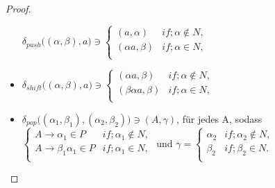 \begin{proof}
\begin{itemize}
$\delta_{push}\big ( (\alpha, \beta),a \big )\ni 
\begin{cases}
(a, \alpha) & if; \alpha \notin N, \\
(\alpha a, \beta) & if;  \alpha \in N, \\
\end{cases}$
\item
$\delta_{shift}\big ( (\alpha, \beta),a \big )\ni 
\begin{cases}
(\alpha a, \beta) & if; \alpha \notin N, \\
(\beta\alpha a, \beta) & if;  \alpha \in N, \\
\end{cases}$
\item
$\delta_{pop}\big ( (\alpha_1, \beta_1), (\alpha_2, \beta_2) \big ) \ni (A, \gamma)$, für jedes A, sodass\\
$\begin{cases}
A\rightarrow \alpha_1\in P & if; \alpha_1 \notin N,\\
A\rightarrow \beta_1\alpha_1 \in P & if; \alpha_1 \in N,\\
\end{cases}$ und $\gamma= 
\begin{cases}
\alpha_2 & if; \alpha_2 \notin N, \\
\beta_2 & if; \beta_2 \in N. \\
\end{cases}$
\end{itemize}
\end{proof}



